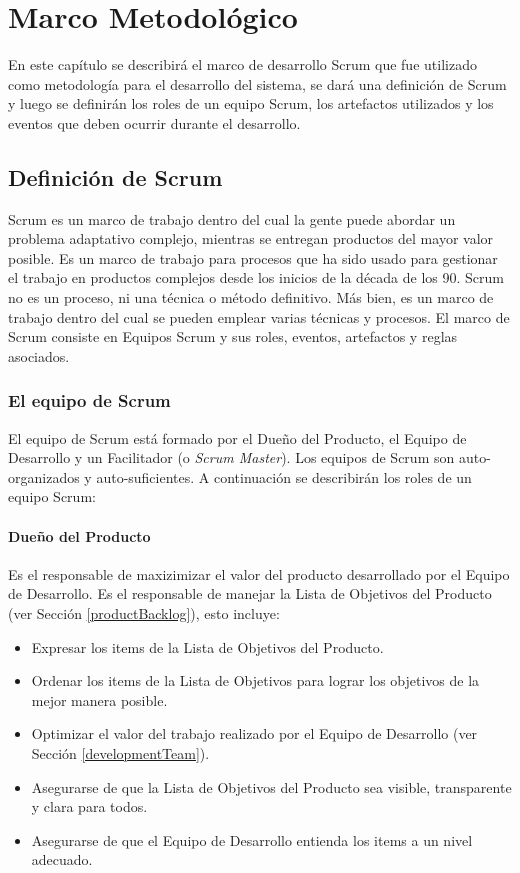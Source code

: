 \chapter{Marco Metodológico} \label{marcoMetodologico}

En este capítulo se describirá el marco de desarrollo Scrum que fue utilizado como metodología para el desarrollo del sistema, se dará una definición de Scrum y luego se definirán los roles de un equipo Scrum, los artefactos utilizados y los eventos que deben ocurrir durante el desarrollo.

\section{Definición de Scrum}
Scrum \cite{scrumSchwaber} es un marco de trabajo dentro del cual la gente puede abordar un problema adaptativo complejo, mientras se entregan productos del mayor valor posible. Es un marco de trabajo para procesos que ha sido usado para gestionar el trabajo en productos complejos desde los inicios de la década de los 90. Scrum no es un proceso, ni una técnica o método definitivo. Más bien, es un marco de trabajo dentro del cual se pueden emplear varias técnicas y procesos. El marco de Scrum consiste en Equipos Scrum y sus roles, eventos, artefactos y reglas asociados.

\subsection{El equipo de Scrum}
El equipo de Scrum está formado por el Dueño del Producto, el Equipo de Desarrollo y un Facilitador (o \emph{Scrum Master}). Los equipos de Scrum son auto-organizados y auto-suficientes. A continuación se describirán los roles de un equipo Scrum:

\subsubsection{Dueño del Producto} \label{productOwner}
Es el responsable de maxizimizar el valor del producto desarrollado por el Equipo de Desarrollo. Es el responsable de manejar la Lista de Objetivos del Producto (ver Sección \ref{productBacklog}), esto incluye:

\begin{itemize}
    \item Expresar los items de la Lista de Objetivos del Producto.
    \item Ordenar los items de la Lista de Objetivos para lograr los objetivos de la mejor manera posible.
    \item Optimizar el valor del trabajo realizado por el Equipo de Desarrollo (ver Sección \ref{developmentTeam}).
    \item Asegurarse de que la Lista de Objetivos del Producto sea visible, transparente y clara para todos.
    \item Asegurarse de que el Equipo de Desarrollo entienda los items a un nivel adecuado.
\end{itemize}

